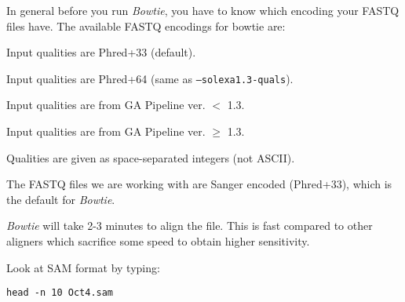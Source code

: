 \begin{note}
In general before you run \emph{Bowtie}, you have to know which encoding your FASTQ files
have. The available FASTQ encodings for bowtie are:

\begin{description}[style=multiline,labelindent=0cm,align=right,leftmargin=\descriptionlabelspace,rightmargin=1.5cm,font=\ttfamily]
 \item[--phred33-quals] Input qualities are Phred+33 (default).
 \item[--phred64-quals] Input qualities are Phred+64 (same as \texttt{--solexa1.3-quals}).
 \item[--solexa-quals] Input qualities are from GA Pipeline ver. $<$ 1.3.
 \item[--solexa1.3-quals] Input qualities are from GA Pipeline ver. $\geq$ 1.3.
 \item[--integer-quals] Qualities are given as space-separated integers (not ASCII).
\end{description}

The FASTQ files we are working with are Sanger encoded (Phred+33), which is the
default for \emph{Bowtie}.

\emph{Bowtie} will take 2-3 minutes to align the file. This is fast compared to
other aligners which sacrifice some speed to obtain higher sensitivity.
\end{note}

\begin{steps}
Look at SAM format by typing:

\begin{lstlisting}
head -n 10 Oct4.sam
\end{lstlisting}
\end{steps}

